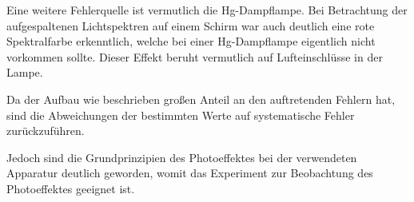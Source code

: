 Eine weitere Fehlerquelle ist vermutlich die Hg-Dampflampe. Bei Betrachtung
der aufgespaltenen Lichtspektren auf einem Schirm war auch deutlich eine rote
Spektralfarbe erkenntlich, welche bei einer Hg-Dampflampe eigentlich nicht vorkommen
sollte. Dieser Effekt beruht vermutlich auf Lufteinschlüsse in der Lampe.

Da der Aufbau wie beschrieben großen Anteil an den auftretenden Fehlern
hat, sind die Abweichungen der bestimmten Werte auf systematische Fehler
zurückzuführen.

Jedoch sind die Grundprinzipien des Photoeffektes bei der verwendeten Apparatur
deutlich geworden, womit das Experiment zur Beobachtung des Photoeffektes
geeignet ist.
